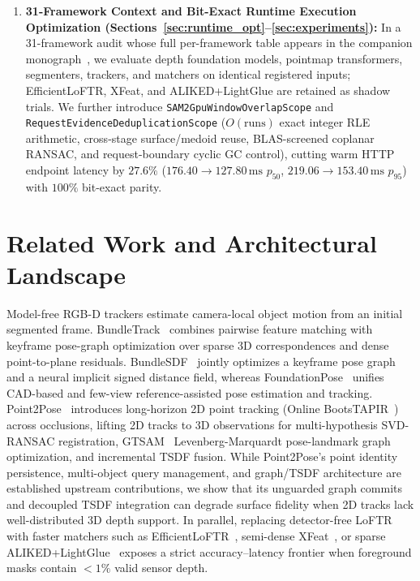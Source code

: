 \documentclass[10pt,journal]{IEEEtran}
\begin{document}
\begin{enumerate}
    \item \textbf{31-Framework Context and Bit-Exact Runtime Execution Optimization (Sections~\ref{sec:runtime_opt}--\ref{sec:experiments}):} In a 31-framework audit whose full per-framework table appears in the companion monograph~\cite{tiwater2026monograph}, we evaluate depth foundation models, pointmap transformers, segmenters, trackers, and matchers on identical registered inputs; EfficientLoFTR, XFeat, and ALIKED+LightGlue are retained as shadow trials. We further introduce \texttt{SAM2GpuWindowOverlapScope} and \texttt{RequestEvidenceDeduplicationScope} ($O(\text{runs})$ exact integer RLE arithmetic, cross-stage surface/medoid reuse, BLAS-screened coplanar RANSAC, and request-boundary cyclic GC control), cutting warm HTTP endpoint latency by $27.6\%$ ($176.40\to 127.80\,\mathrm{ms}$ $p_{50}$, $219.06\to 153.40\,\mathrm{ms}$ $p_{95}$) with $100\%$ bit-exact parity.
\end{enumerate}

\section{Related Work and Architectural Landscape}
\label{sec:related}

Model-free RGB-D trackers estimate camera-local object motion from an initial segmented frame. BundleTrack~\cite{bundletrack} combines pairwise feature matching with keyframe pose-graph optimization over sparse 3D correspondences and dense point-to-plane residuals. BundleSDF~\cite{bundlesdf} jointly optimizes a keyframe pose graph and a neural implicit signed distance field, whereas FoundationPose~\cite{foundationpose} unifies CAD-based and few-view reference-assisted pose estimation and tracking. Point2Pose~\cite{point2pose} introduces long-horizon 2D point tracking (Online BootsTAPIR~\cite{bootstap}) across occlusions, lifting 2D tracks to 3D observations for multi-hypothesis SVD-RANSAC registration, GTSAM~\cite{gtsam} Levenberg-Marquardt pose-landmark graph optimization, and incremental TSDF fusion. While Point2Pose's point identity persistence, multi-object query management, and graph/TSDF architecture are established upstream contributions, we show that its unguarded graph commits and decoupled TSDF integration can degrade surface fidelity when 2D tracks lack well-distributed 3D depth support. In parallel, replacing detector-free LoFTR~\cite{loftr} with faster matchers such as EfficientLoFTR~\cite{eloftr}, semi-dense XFeat~\cite{xfeat}, or sparse ALIKED+LightGlue~\cite{aliked,lightglue} exposes a strict accuracy--latency frontier when foreground masks contain $<1\%$ valid sensor depth.
\end{document}
